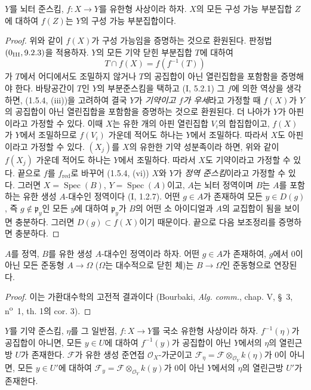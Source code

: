 \begin{corollary}[1.8.5]
\label{IV.1.8.5-fr}
$Y$를 뇌터 준스킴, $f:X\to Y$를 유한형 사상이라 하자. $X$의 모든
구성 가능 부분집합 $Z$에 대하여 $f(Z)$는 $Y$의 구성 가능
부분집합이다.
\end{corollary}


\begin{proof}
위와 같이 $f(X)$가 구성 가능임을 증명하는 것으로 환원된다. 판정법
$(0\textsubscript{III}, 9.2.3)$을 적용하자. $Y$의 모든 기약 닫힌
부분집합 $T$에 대하여
\[
  T\cap f(X)=f(f^{-1}(T))
\]
가 $T$에서 어디에서도 조밀하지 않거나 $T$의 공집합이 아닌
열린집합을 포함함을 증명해야 한다. 바탕공간이 $T$인 $Y$의
부분준스킴을 택하고 (I, 5.2.1) 그 $f$에 의한 역상을 생각하면,
(1.5.4, (iii))을 고려하여 결국 $Y$가 \emph{기약이고 $f$가
우세}라고 가정할 때 $f(X)$가 $Y$의 공집합이 아닌 열린집합을
포함함을 증명하는 것으로 환원된다. 더 나아가 $Y$가 아핀이라고
가정할 수 있다. 이때 $X$는 유한 개의 아핀 열린집합 $V_i$의
합집합이고, $f(X)$가 $Y$에서 조밀하므로 $f(V_i)$ 가운데 적어도
하나는 $Y$에서 조밀하다. 따라서 $X$도 아핀이라고 가정할 수 있다.
$(X_j)$를 $X$의 유한한 기약 성분족이라 하면, 위와 같이
$f(X_j)$ 가운데 적어도 하나는 $Y$에서 조밀하다. 따라서 $X$도
기약이라고 가정할 수 있다. 끝으로 $f$를 $f_{\mathrm{red}}$로
바꾸어 (1.5.4, (vi)) $X$와 $Y$가 \emph{정역 준스킴}이라고 가정할
수 있다. 그러면 $X=\operatorname{Spec}(B)$,
$Y=\operatorname{Spec}(A)$이고, $A$는 뇌터 정역이며 $B$는 $A$를
포함하는 유한 생성 $A$-대수인 정역이다 (I, 1.2.7). 어떤 $g\in A$가
존재하여 모든 $y\in D(g)$, 즉 $g\notin\mathfrak p_y$인 모든 $y$에
대하여 $\mathfrak p_y$가 $B$의 어떤 소 아이디얼과 $A$의 교집합이
됨을 보이면 충분하다. 그러면 $D(g)\subset f(X)$이기 때문이다.
끝으로 다음 보조정리를 증명하면 충분하다.
\end{proof}

\begin{lemma}[1.8.5.1]
\label{IV.1.8.5.1-fr}
$A$를 정역, $B$를 유한 생성 $A$-대수인 정역이라 하자. 어떤
$g\in A$가 존재하여, $g$에서 0이 아닌 모든 준동형
$A\to\Omega$ ($\Omega$는 대수적으로 닫힌 체)는 $B\to\Omega$인
준동형으로 연장된다.
\end{lemma}

\begin{proof}
이는 가환대수학의 고전적 결과이다 (Bourbaki, \emph{Alg. comm.},
chap. V, \S~3, n\textsuperscript{o}~1, th. 1의 cor. 3).
\end{proof}

\begin{corollary}[1.8.6]
\label{IV.1.8.6-fr}
$Y$를 기약 준스킴, $\eta$를 그 일반점, $f:X\to Y$를 국소 유한형
사상이라 하자. $f^{-1}(\eta)$가 공집합이 아니면, 모든 $y\in U$에
대하여 $f^{-1}(y)$가 공집합이 아닌 $Y$에서의 $\eta$의 열린근방
$U$가 존재한다. $\mathscr F$가 유한 생성 준연접
$\mathcal O_X$-가군이고
$\mathscr F_\eta=\mathscr F\otimes_{\mathcal O_Y}k(\eta)$가 0이
아니면, 모든 $y\in U'$에 대하여
$\mathscr F_y=\mathscr F\otimes_{\mathcal O_Y}k(y)$가 0이 아닌
$Y$에서의 $\eta$의 열린근방 $U'$가 존재한다.
\end{corollary}

